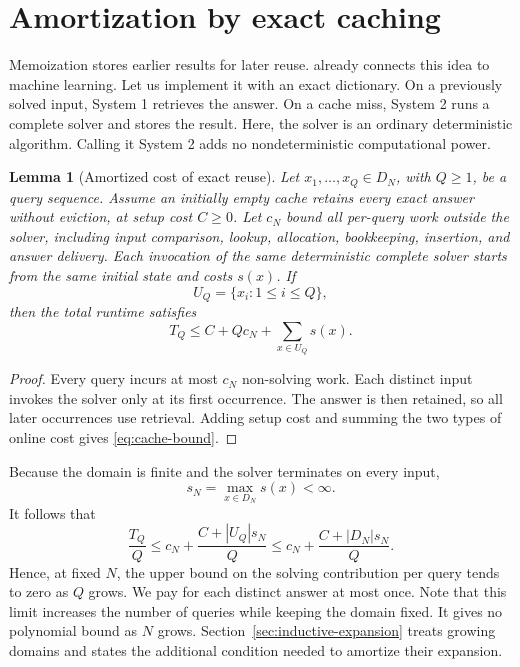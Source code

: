 \documentclass[11pt,a4paper]{article}
\numberwithin{equation}{section}
\theoremstyle{plain}
\newtheorem{lemma}{Lemma}[section]
\theoremstyle{definition}
\theoremstyle{remark}
\begin{document}
\section{Amortization by exact caching}
\label{sec:cache}

Memoization stores earlier results for later reuse. \citet{michie1968} already connects this idea to machine learning. Let us implement it with an exact dictionary. On a previously solved input, System 1 retrieves the answer. On a cache miss, System 2 runs a complete solver and stores the result. Here, the solver is an ordinary deterministic algorithm. Calling it System 2 adds no nondeterministic computational power.

\begin{lemma}[Amortized cost of exact reuse]
\label{lem:cache}
Let $x_1,\ldots,x_Q\in D_N$, with $Q\geq1$, be a query sequence. Assume an initially empty cache retains every exact answer without eviction, at setup cost $C\geq0$. Let $c_N$ bound all per-query work outside the solver, including input comparison, lookup, allocation, bookkeeping, insertion, and answer delivery. Each invocation of the same deterministic complete solver starts from the same initial state and costs $s(x)$. If
\begin{equation}
U_Q=\{x_i:1\leq i\leq Q\},
\end{equation}
then the total runtime satisfies
\begin{equation}
\boxed{T_Q\leq C+Qc_N+\sum_{x\in U_Q}s(x).}
\label{eq:cache-bound}
\end{equation}
\end{lemma}

\begin{proof}
Every query incurs at most $c_N$ non-solving work. Each distinct input invokes the solver only at its first occurrence. The answer is then retained, so all later occurrences use retrieval. Adding setup cost and summing the two types of online cost gives \eqref{eq:cache-bound}.
\end{proof}

Because the domain is finite and the solver terminates on every input,
\begin{equation}
s_N=\max_{x\in D_N}s(x)<\infty.
\end{equation}
It follows that
\begin{equation}
\frac{T_Q}{Q}\leq c_N+\frac{C+|U_Q|s_N}{Q}
\leq c_N+\frac{C+|D_N|s_N}{Q}.
\label{eq:amortized}
\end{equation}
Hence, at fixed $N$, the upper bound on the solving contribution per query tends to zero as $Q$ grows. We pay for each distinct answer at most once. Note that this limit increases the number of queries while keeping the domain fixed. It gives no polynomial bound as $N$ grows. Section~\ref{sec:inductive-expansion} treats growing domains and states the additional condition needed to amortize their expansion.
\end{document}

